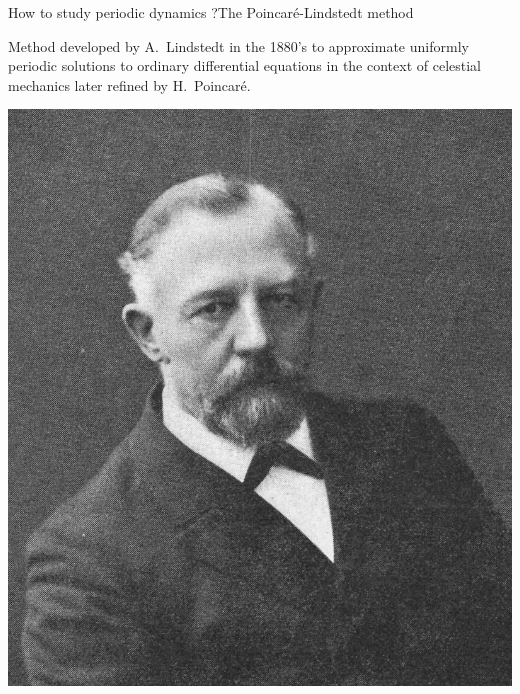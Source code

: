 \documentclass[usenames,dvipsnames,svgnames,10pt,aspectratio=169]{beamer}
\begin{document}
\begin{frame}[t, c]{How to study periodic dynamics ?}{The Poincaré-Lindstedt method}
  \begin{minipage}{.68\textwidth}
    Method developed by A.\ Lindstedt in the 1880's to approximate uniformly periodic solutions to ordinary differential equations in the context of celestial mechanics later refined by H.\ Poincaré.
  \end{minipage}%
  \hfill
  \begin{minipage}{.28\textwidth}
    \centering
    \includegraphics[width=\textwidth]{lindsted}
  \end{minipage}

  \vspace{1cm}
\end{frame}
\end{document}
